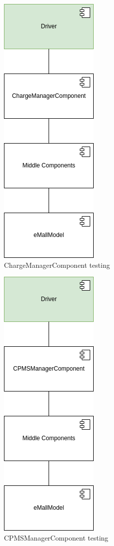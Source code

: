 \begin{figure}[H]
    \centering
    \includegraphics[keepaspectratio]{Testing/emall/chargemanager.png}
    \caption{ChargeManagerComponent testing}
\end{figure}
\begin{figure}[H]
    \centering
    \includegraphics[keepaspectratio]{Testing/emall/cpmsmanager.png}
    \caption{\ac{CPMS}ManagerComponent testing}
\end{figure}
